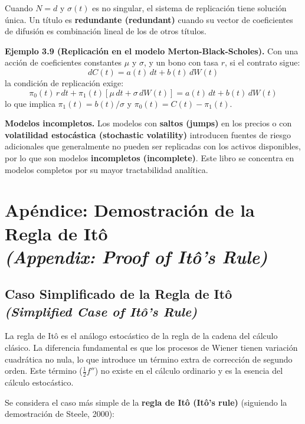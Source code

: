 \documentclass[12pt]{article}
\begin{document}
Cuando $N = d$ y $\sigma(t)$ es no singular, el sistema de replicaci\'on tiene soluci\'on \'unica. Un t\'itulo es \textbf{redundante (redundant)} cuando su vector de coeficientes de difusi\'on es combinaci\'on lineal de los de otros t\'itulos.

\textbf{Ejemplo 3.9 (Replicaci\'on en el modelo Merton-Black-Scholes).} Con una acci\'on de coeficientes constantes $\mu$ y $\sigma$, y un bono con tasa $r$, si el contrato sigue:
\[
  dC(t) = a(t)\,dt + b(t)\,dW(t)
\]
la condici\'on de replicaci\'on exige:
\[
  \pi_0(t)\,r\,dt + \pi_1(t)[\mu\,dt + \sigma\,dW(t)] = a(t)\,dt + b(t)\,dW(t)
\]
lo que implica $\pi_1(t) = b(t)/\sigma$ y $\pi_0(t) = C(t) - \pi_1(t)$.

\textbf{Modelos incompletos.} Los modelos con \textbf{saltos (jumps)} en los precios o con \textbf{volatilidad estoc\'astica (stochastic volatility)} introducen fuentes de riesgo adicionales que generalmente no pueden ser replicadas con los activos disponibles, por lo que son modelos \textbf{incompletos (incomplete)}. Este libro se concentra en modelos completos por su mayor tractabilidad anal\'itica.

\section{Ap\'endice: Demostraci\'on de la Regla de It\^o\\
\textit{(Appendix: Proof of It\^o's Rule)}}

\subsection{Caso Simplificado de la Regla de It\^o \textit{(Simplified Case of It\^o's Rule)}}

\begin{intuicion}
La regla de It\^o es el an\'alogo estoc\'astico de la regla de la cadena del c\'alculo cl\'asico. La diferencia fundamental es que los procesos de Wiener tienen variaci\'on cuadr\'atica no nula, lo que introduce un t\'ermino extra de correcci\'on de segundo orden. Este t\'ermino ($\frac{1}{2}f''$) no existe en el c\'alculo ordinario y es la esencia del c\'alculo estoc\'astico.
\end{intuicion}

Se considera el caso m\'as simple de la \textbf{regla de It\^o (It\^o's rule)} (siguiendo la demostraci\'on de Steele, 2000):
\end{document}
